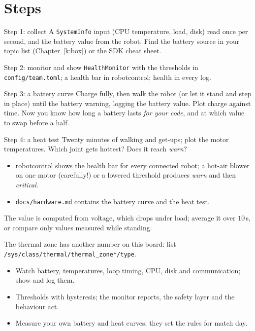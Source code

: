 \section*{Steps}
\begin{stepbox}{Step 1: collect}
A \texttt{SystemInfo} input (CPU temperature, load, disk) read once per second, and the battery value from the robot. Find the battery source in your topic list (Chapter~\ref{k:box}) or the SDK cheat sheet.
\end{stepbox}
\begin{stepbox}{Step 2: monitor and show}
\texttt{HealthMonitor} with the thresholds in \texttt{config/team.toml}; a health bar in robotcontrol; health in every log.
\end{stepbox}
\begin{stepbox}{Step 3: a battery curve}
Charge fully, then walk the robot (or let it stand and step in place) until the battery warning, logging the battery value. Plot charge against time. Now you know how long a battery lasts \emph{for your code}, and at which value to swap before a half.
\end{stepbox}
\begin{stepbox}{Step 4: a heat test}
Twenty minutes of walking and get-ups; plot the motor temperatures. Which joint gets hottest? Does it reach \emph{warn}?
\end{stepbox}

\begin{checkbox}
\begin{itemize}[nosep]
  \item robotcontrol shows the health bar for every connected robot; a hot-air blower on one motor (carefully!) or a lowered threshold produces \emph{warn} and then \emph{critical}.
  \item \texttt{docs/hardware.md} contains the battery curve and the heat test.
\end{itemize}
\end{checkbox}

\begin{troublebox}
\begin{description}[leftmargin=0.6cm,nosep]
  \item[Battery percentage jumps] The value is computed from voltage, which drops under load; average it over $10$\,s, or compare only values measured while standing.
  \item[CPU temperature file not found] The thermal zone has another number on this board: list \verb!/sys/class/thermal/thermal_zone*/type!.
\end{description}
\end{troublebox}

\begin{keyidea}
\begin{itemize}[nosep]
  \item Watch battery, temperatures, loop timing, CPU, disk and communication; show and log them.
  \item Thresholds with hysteresis; the monitor reports, the safety layer and the behaviour act.
  \item Measure your own battery and heat curves; they set the rules for match day.
\end{itemize}
\end{keyidea}
